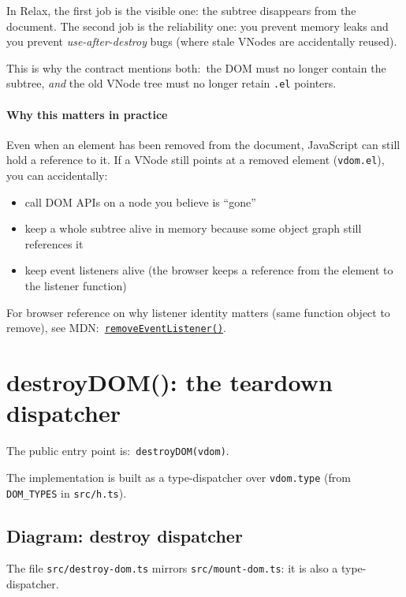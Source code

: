 In Relax, the first job is the visible one: the subtree disappears from the document.
The second job is the reliability one: you prevent memory leaks and you prevent \emph{use-after-destroy} bugs (where stale VNodes are accidentally reused).

This is why the contract mentions both:\ the DOM must no longer contain the subtree, \emph{and} the old VNode tree must no longer retain \texttt{.el} pointers.

\paragraph{Why this matters in practice}

Even when an element has been removed from the document, JavaScript can still hold a reference to it.
If a VNode still points at a removed element (\texttt{vdom.el}), you can accidentally:

\begin{itemize}
  \item call DOM APIs on a node you believe is ``gone''
  \item keep a whole subtree alive in memory because some object graph still references it
  \item keep event listeners alive (the browser keeps a reference from the element to the listener function)
\end{itemize}

For browser reference on why listener identity matters (same function object to remove), see MDN:\ \href{https://developer.mozilla.org/en-US/docs/Web/API/EventTarget/removeEventListener}{\texttt{removeEventListener()}}.

\section{destroyDOM(): the teardown dispatcher}

The public entry point is:\ \texttt{destroyDOM(vdom)}.

The implementation is built as a type-dispatcher over \texttt{vdom.type} (from \texttt{DOM\_TYPES} in \texttt{src/h.ts}).

\subsection*{Diagram: destroy dispatcher}
The file \texttt{src/destroy-dom.ts} mirrors \texttt{src/mount-dom.ts}: it is also a type-dispatcher.

